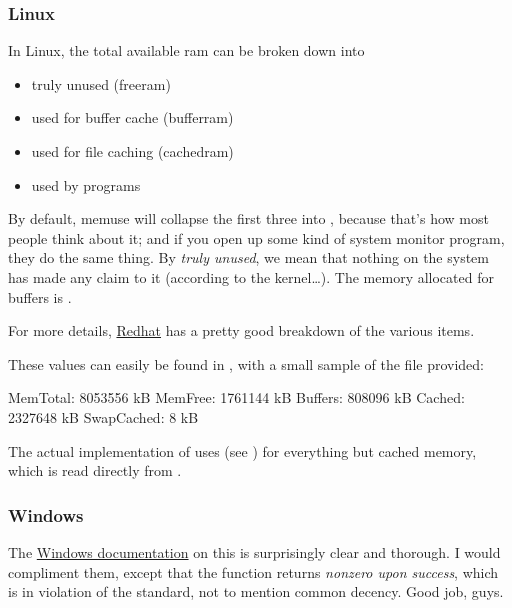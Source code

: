 \subsubsection{Linux}
In Linux, the total available ram can be broken down into
\begin{itemize}
  \item truly unused (freeram)
  \item used for buffer cache (bufferram)
  \item used for file caching (cachedram)
  \item used by programs
\end{itemize}

By default, memuse will collapse the first three into , because that's how most people think about it; and if you open up some kind of system monitor program, they do the same thing.  By \emph{truly unused}, we mean that nothing on the system has made any claim to it (according to the kernel\dots).  The memory allocated for buffers is .

For more details, \href{https://www.redhat.com/advice/tips/meminfo.html}{Redhat} has a pretty good breakdown of the various items.


These values can easily be found in , with a small sample of the file provided:

\begin{center}
\begin{minipage}{.4\textwidth}
\begin{Output}
MemTotal:        8053556 kB
MemFree:         1761144 kB
Buffers:          808096 kB
Cached:          2327648 kB
SwapCached:            8 kB
\end{Output}
\end{minipage}
\end{center}

The actual implementation of  uses  (see ) for everything but cached memory, which is read directly from .




\subsubsection{Windows}

The \href{http://msdn.microsoft.com/en-us/library/windows/desktop/aa366589%28v=vs.85%29.aspx}{Windows documentation} 
on this is surprisingly clear and thorough.  I would compliment them, except that the function returns \emph{nonzero upon success}, which is in violation of the  standard, not to mention common decency.  Good job, guys.

